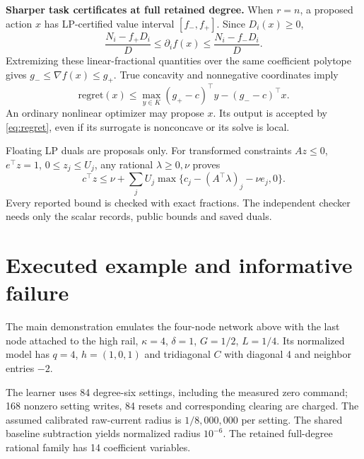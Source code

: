 \documentclass[10pt,a4paper]{article}
\begin{document}
\textbf{Sharper task certificates at full retained degree.} When $r=n$, a
proposed action $x$ has LP-certified value interval $[f_-,f_+]$. Since
$D_i(x)\ge0$,
\begin{equation}
 \frac{N_i-f_+D_i}{D}\le\partial_i f(x)
                     \le\frac{N_i-f_-D_i}{D}.
\end{equation}
Extremizing these linear-fractional quantities over the same coefficient
polytope gives $g_-\le\nabla f(x)\le g_+$. True concavity and nonnegative
coordinates imply
\begin{equation}
 \mathrm{regret}(x)\le
 \max_{y\in K}(g_+-c)^\top y-(g_--c)^\top x.
 \label{eq:regret}
\end{equation}
An ordinary nonlinear optimizer may propose $x$. Its output is accepted by
\eqref{eq:regret}, even if its surrogate is nonconcave or its solve is local.

Floating LP duals are proposals only. For transformed constraints $Az\le0$,
$e^\top z=1$, $0\le z_j\le U_j$, any rational $\lambda\ge0,\nu$ proves
\[
 c^\top z\le\nu+\sum_j U_j\max\{c_j-(A^\top\lambda)_j-\nu e_j,0\}.
\]
Every reported bound is checked with exact fractions. The independent checker
needs only the scalar records, public bounds and saved duals.

\section{Executed example and informative failure}

The main demonstration emulates the four-node network above with the last node
attached to the high rail, $\kappa=4$, $\delta=1$, $G=1/2$, $L=1/4$.
Its normalized model has $q=4$, $h=(1,0,1)$ and tridiagonal $C$ with diagonal
4 and neighbor entries $-2$.

The learner uses 84 degree-six settings, including the measured zero command;
168 nonzero setting writes, 84 resets and corresponding clearing are charged.
The assumed calibrated raw-current radius is $1/8{,}000{,}000$ per setting.
The shared baseline subtraction yields normalized radius $10^{-6}$. The
retained full-degree rational family has 14 coefficient variables.
\end{document}

